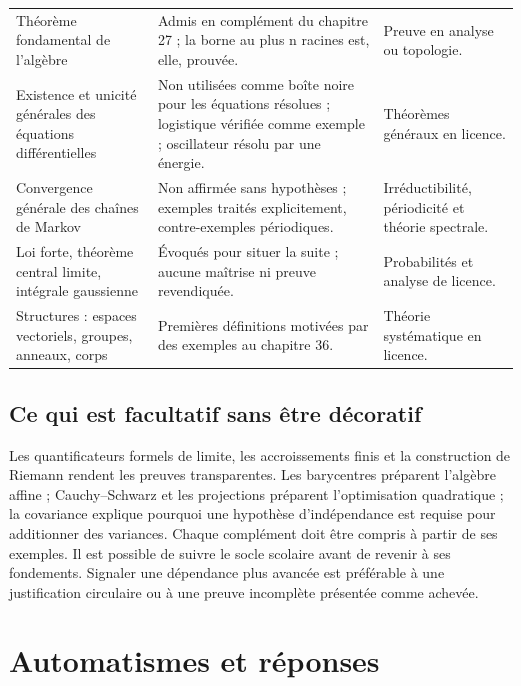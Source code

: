 \begin{longtable}{@{}>{\raggedright\arraybackslash}p{}>{\raggedright\arraybackslash}p{}>{\raggedright\arraybackslash}p{}@{}}
Théorème fondamental de l’algèbre & Admis en complément du chapitre 27 ; la borne au plus n racines est, elle, prouvée. & Preuve en analyse ou topologie.\\
Existence et unicité générales des équations différentielles & Non utilisées comme boîte noire pour les équations résolues ; logistique vérifiée comme exemple ; oscillateur résolu par une énergie. & Théorèmes généraux en licence.\\
Convergence générale des chaînes de Markov & Non affirmée sans hypothèses ; exemples traités explicitement, contre-exemples périodiques. & Irréductibilité, périodicité et théorie spectrale.\\
Loi forte, théorème central limite, intégrale gaussienne & Évoqués pour situer la suite ; aucune maîtrise ni preuve revendiquée. & Probabilités et analyse de licence.\\
Structures : espaces vectoriels, groupes, anneaux, corps & Premières définitions motivées par des exemples au chapitre 36. & Théorie systématique en licence.\\
\bottomrule\end{longtable}
\section{Ce qui est facultatif sans être décoratif}
Les quantificateurs formels de limite, les accroissements finis et la construction de Riemann rendent les preuves transparentes. Les barycentres préparent l'algèbre affine ; Cauchy--Schwarz et les projections préparent l'optimisation quadratique ; la covariance explique pourquoi une hypothèse d'indépendance est requise pour additionner des variances.
Chaque complément doit être compris à partir de ses exemples. Il est possible de suivre le socle scolaire avant de revenir à ses fondements. Signaler une dépendance plus avancée est préférable à une justification circulaire ou à une preuve incomplète présentée comme achevée.
\chapter{Automatismes et réponses}
